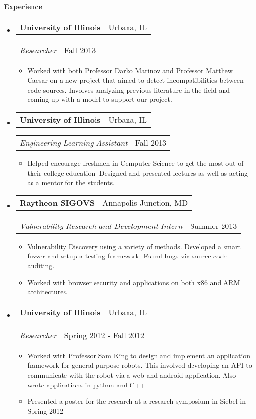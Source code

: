 \documentclass[letterpaper,11pt]{article}
\makeatletter
\newcommand{\resitem}[1]{\item #1 \vspace{-5pt}}
\newcommand{\resheading}[1]{{\large \colorbox{mygrey}{\begin{minipage}{\textwidth}{\textbf{#1 \vphantom{p\^{E}}}}\end{minipage}}}}
\newcommand{\resexperience}[4]
{
  \begin{tabular*}{6.5in}{l@{\extracolsep{\fill}}r}
    \textbf{#1} & \footnotesize{#2}
  \end{tabular*}
  \begin{tabular*}{6.5in}{l@{\extracolsep{\fill}}r}
    \textit{#3} & \footnotesize{#4}
  \end{tabular*}
  \vspace{-8pt}
}
\makeatother
\begin{document}
\resheading{Experience}
\begin{itemize}
\item
  \resexperience{University of Illinois}{Urbana, IL}{Researcher}{Fall 2013}
  {\footnotesize
    \begin{itemize}
      \resitem{ Worked with both Professor Darko Marinov
                       and Professor Matthew Caesar on a new project
                       that aimed to detect incompatibilities between
                       code sources.  Involves analyzing previous
                       literature in the field and coming up with a
                       model to support our project.}
    \end{itemize}
  }
\item
  \resexperience{University of Illinois}{Urbana, IL}{Engineering
    Learning Assistant}{Fall 2013}
  {\footnotesize
    \begin{itemize}
      \resitem{ Helped encourage freshmen in Computer
                       Science to get the most out of their college
                       education.  Designed and presented lectures as
                       well as acting as a mentor for the students.}
    \end{itemize}
  }
\item
  \resexperience{Raytheon SIGOVS}{Annapolis Junction,
    MD}{Vulnerability Research and Development Intern}{Summer 2013}
  {\footnotesize
    \begin{itemize}
      \resitem{ Vulnerability Discovery using a variety of
                      methods.  Developed a smart fuzzer and setup a
                      testing framework.  Found bugs via source code
                      auditing.}
      \resitem{Worked with browser security
                      and applications on both x86 and ARM architectures.}
    \end{itemize}
  }
\item
  \resexperience{University of Illinois}{Urbana, IL}{Researcher}{Spring 2012 - Fall 2012}
  {\footnotesize
    \begin{itemize}
      \resitem{ Worked with Professor Sam King to design
                     and implement an application framework for
                     general purpose robots.  This involved developing
                     an API to communicate with the robot via a web
                     and android application.  Also wrote applications
                     in python and C++.}
      \resitem{ Presented a poster for
                     the research at a research symposium in Siebel in
                     Spring 2012.}
    \end{itemize}
  }
\end{itemize}
\end{document}
